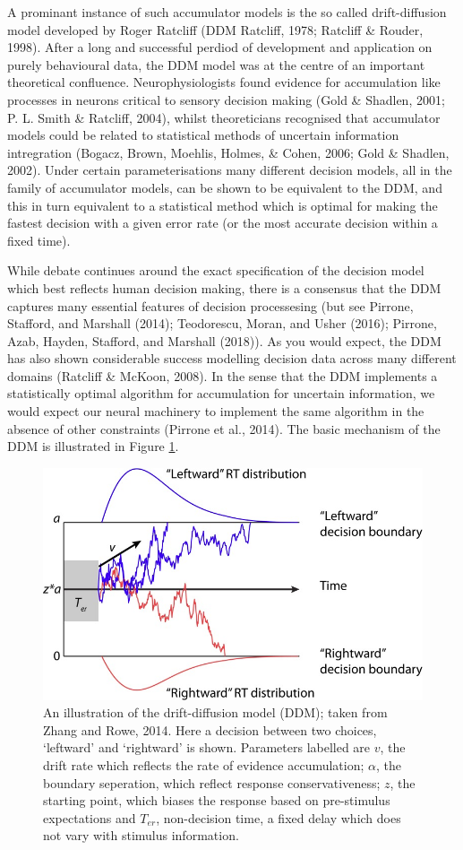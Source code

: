 \documentclass[floatsintext,doc]{apa6}
\theoremstyle{definition}
\theoremstyle{definition}
\theoremstyle{definition}
\theoremstyle{remark}
\begin{document}
A prominant instance of such accumulator models is the so called
drift-diffusion model developed by Roger Ratcliff (DDM Ratcliff, 1978;
Ratcliff \& Rouder, 1998). After a long and successful perdiod of
development and application on purely behavioural data, the DDM model
was at the centre of an important theoretical confluence.
Neurophysiologists found evidence for accumulation like processes in
neurons critical to sensory decision making (Gold \& Shadlen, 2001; P.
L. Smith \& Ratcliff, 2004), whilst theoreticians recognised that
accumulator models could be related to statistical methods of uncertain
information intregration (Bogacz, Brown, Moehlis, Holmes, \& Cohen,
2006; Gold \& Shadlen, 2002). Under certain parameterisations many
different decision models, all in the family of accumulator models, can
be shown to be equivalent to the DDM, and this in turn equivalent to a
statistical method which is optimal for making the fastest decision with
a given error rate (or the most accurate decision within a fixed time).

While debate continues around the exact specification of the decision
model which best reflects human decision making, there is a consensus
that the DDM captures many essential features of decision processesing
(but see Pirrone, Stafford, and Marshall (2014); Teodorescu, Moran, and
Usher (2016); Pirrone, Azab, Hayden, Stafford, and Marshall (2018)). As
you would expect, the DDM has also shown considerable success modelling
decision data across many different domains (Ratcliff \& McKoon, 2008).
In the sense that the DDM implements a statistically optimal algorithm
for accumulation for uncertain information, we would expect our neural
machinery to implement the same algorithm in the absence of other
constraints (Pirrone et al., 2014). The basic mechanism of the DDM is
illustrated in Figure \ref{fig:ddm}.

\begin{figure}

{\centering \includegraphics[width=0.6\linewidth]{figs/zhang_fig1} 

}

\caption{An illustration of the drift-diffusion model (DDM); taken from Zhang and Rowe, 2014. Here a decision between two choices, `leftward' and `rightward' is shown. Parameters labelled are $v$, the drift rate which reflects the rate of evidence accumulation; $\alpha$, the boundary seperation, which reflect response conservativeness; $z$, the starting point, which biases the response based on pre-stimulus expectations and $T_{er}$, non-decision time, a fixed delay which does not vary with stimulus information.}\label{fig:ddm}
\end{figure}
\end{document}

